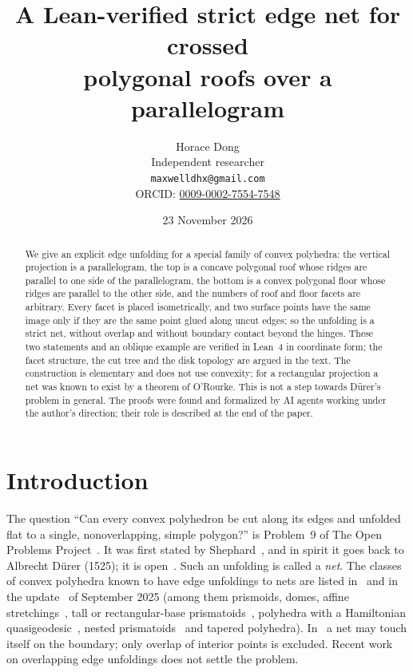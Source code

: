 \documentclass[11pt]{article}
\title{A Lean-verified strict edge net for crossed\\ polygonal roofs over a parallelogram}
\author{Horace Dong\\ \small Independent researcher\\
\small\texttt{maxwelldhx@gmail.com}\\
\small ORCID: \href{https://orcid.org/0009-0002-7554-7548}{0009-0002-7554-7548}}
\date{23 November 2026}
\theoremstyle{definition}
\theoremstyle{remark}
\begin{document}
\sloppy
\maketitle

\begin{abstract}
We give an explicit edge unfolding for a special family of convex polyhedra:
the vertical projection is a parallelogram, the top is a concave polygonal
roof whose ridges are parallel to one side of the parallelogram, the bottom
is a convex polygonal floor whose ridges are parallel to the other side, and
the numbers of roof and floor facets are arbitrary. Every facet is placed isometrically, and two surface points have the
same image only if they are the same point glued along uncut edges; so the
unfolding is a strict net, without overlap and without boundary contact
beyond the hinges. These two statements and an oblique example are verified in
Lean~4 in coordinate form; the facet structure, the cut tree and the disk
topology are argued in the text. The construction is elementary and
does not use convexity; for a rectangular projection a net was known to exist
by a theorem of O'Rourke. This is not a step towards D\"urer's problem in
general. The proofs were found and formalized by AI
agents working under the author's direction; their role is described at the
end of the paper.
\end{abstract}

\section{Introduction}\label{sec:intro}

The question ``Can every convex polyhedron be cut along its edges and
unfolded flat to a single, nonoverlapping, simple polygon?'' is Problem~9 of
The Open Problems Project~\cite{topp}. It was first stated by
Shephard~\cite{shephard}, and in spirit it goes back to Albrecht D\"urer
(1525); it is open~\cite{topp}. Such an unfolding is called a \emph{net}.
The classes of convex polyhedra known to have edge unfoldings to nets are
listed in~\cite[Section~22.5]{do07} and in the update~\cite{do25} of
September 2025 (among them prismoids, domes, affine
stretchings~\cite{ghomi}, tall or rectangular-base prismatoids~\cite{bdm},
polyhedra with a Hamiltonian
quasigeodesic~\cite{oro22}, nested prismatoids~\cite{radons} and tapered
polyhedra). In~\cite{do25} a net may touch itself on the boundary;
only overlap of interior points is excluded. Recent work~\cite{mit26} on
overlapping edge unfoldings does not settle the problem.
\end{document}
